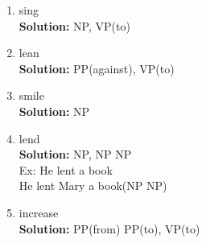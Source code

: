 \documentclass[11pt]{article}
\begin{document}
\begin{enumerate}
\begin{enumerate}
\item sing \\
\textbf{Solution:}  NP, VP(to)\\

\item lean \\
\textbf{Solution:} PP(against), VP(to)\\

\item smile \\
\textbf{Solution:} NP\\

\item lend \\
\textbf{Solution:} NP, NP NP\\
Ex: He lent a book \\
He lent Mary a book(NP NP)

\item increase \\
\textbf{Solution:} PP(from) PP(to), VP(to) \\

\end{enumerate}

\end{enumerate}  %
\end{document}
